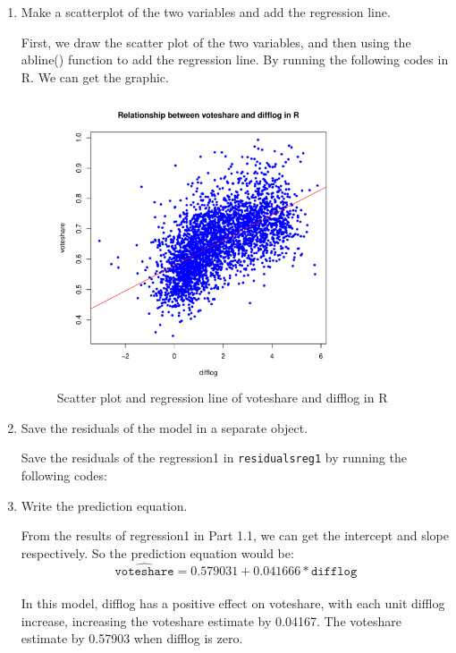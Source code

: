 \documentclass[12pt,letterpaper]{article}
\begin{document}
\begin{enumerate}
		\item Make a scatterplot of the two variables and add the regression line. 	\vspace{.15cm}
		
		\noindent First, we draw the scatter plot of the two variables, and then using the abline() function to add the regression line. By running the following codes in R. We can get the graphic.\\
		
		
		
		\begin{figure}[h]
			\centering
			\includegraphics[width=0.8\textwidth]{Scatter plot and regression line of voteshare and difflog in R.pdf}
			\caption{Scatter plot and regression line of voteshare and difflog in R}
			\label{fig:pdf}
		\end{figure}
		
		\newpage
		\item Save the residuals of the model in a separate object.	\vspace{.17cm}
		
		\noindent Save the residuals of the regression1 in \texttt{residuals\textunderscore{}reg1} by running the following codes:\\
		
		
		
		\item Write the prediction equation.
		
		\noindent From the results of regression1 in Part 1.1, we can get the intercept and slope respectively. So the prediction equation would be:\\  
		\[ \hat{\texttt{voteshare}} = 0.579031 + 0.041666* \texttt{difflog} 
		\]\\ In this model, difflog has a positive effect on voteshare, with each unit difflog increase, increasing the voteshare estimate by 0.04167. The  voteshare estimate by 0.57903 when difflog is zero.\\
		
	\end{enumerate}
\end{document}
